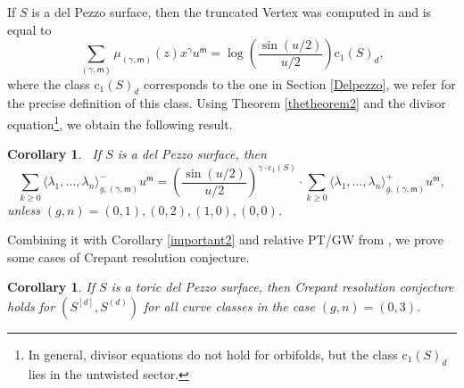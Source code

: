 \documentclass[11pt, reqno]{amsart}
\theoremstyle{plain}
\newtheorem{cor}[thm]{Corollary}
\renewcommand{\arraystretch}{2}
\theoremstyle{definition}
\theoremstyle{remark}
\newcommand{\msf}{{\mathsf{m}}}
\begin{document}
If $S$ is a del Pezzo surface,  then the truncated Vertex was computed in \cite[Proposition 5.1]{N22} and is equal to
\[ \sum_{(\gamma,\msf)}\mu_{(\gamma,\msf)}(z)x^\gamma u^\msf= \log\left(\frac{\sin(u/2)}{u/2}\right)\mathrm{c}_1(S)_d,\]
where the class $\mathrm{c}_1(S)_d$ corresponds to the one in Section \ref{Delpezzo}, we refer \cite[Section 5]{N22} for the precise definition of this class. Using Theorem \ref{thetheorem2} and the divisor equation\footnote{In general, divisor equations do not hold for orbifolds, but the class $\mathrm{c}_1(S)_d$ lies in the untwisted sector.}, we obtain the following result. 
\begin{cor}\ \label{important3}If $S$ is a del Pezzo surface, then 
	\[ \sum_{k\geq 0} \langle \lambda_1 , \dots,\lambda_n  \rangle^{-}_{g,(\gamma,\msf)} u^{\msf} = \left(\frac{\sin(u/2)}{u/2}\right)^{\gamma\cdot\mathrm{c}_1(S)}\cdot \sum_{k\geq 0} \langle \lambda_1, \dots,\lambda_n \rangle^{+}_{g,(\gamma,\msf)}u^{\msf},\] 
	unless $(g,n)=(0,1), (0,2), (1,0),(0,0)$. 
\end{cor}
Combining it with Corollary \ref{important2} and relative PT/GW from \cite{MOOP}, we prove some cases of Crepant resolution conjecture. 
\begin{cor} If $S$ is a toric del Pezzo surface, then  Crepant resolution conjecture holds for $(S^{[d]}, S^{(d)})$ for all curve classes in the case $(g,n)=(0,3)$.
	\end{cor}
	
	
	
\end{document}
